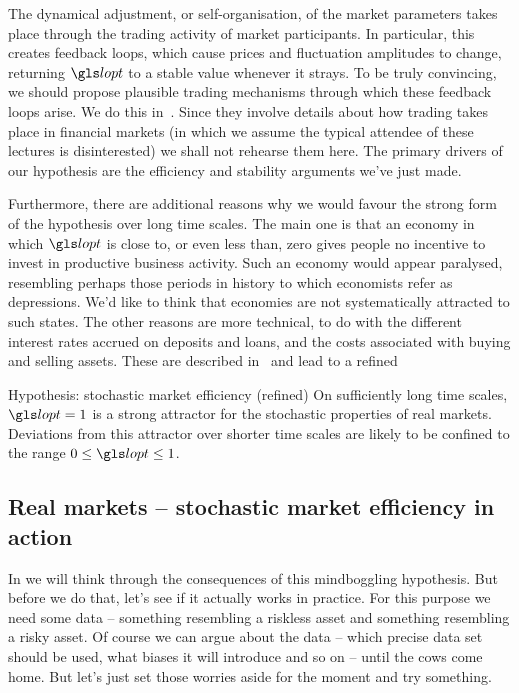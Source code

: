 The dynamical adjustment, or self-organisation, of the market parameters takes place through the trading activity of market participants. In particular, this creates feedback loops, which cause prices and fluctuation amplitudes to change, returning $\lopt$ to a stable value whenever it strays. To be truly convincing, we should propose plausible trading mechanisms through which these feedback loops arise. We do this in~\cite{PetersAdamou2013}. Since they involve details about how trading takes place in financial markets (in which we assume the typical attendee of these lectures is disinterested) we shall not rehearse them here. The primary drivers of our hypothesis are the efficiency and stability arguments we've just made.

Furthermore, there are additional reasons why we would favour the strong form of the hypothesis over long time scales. The main one is that an economy in which $\lopt$ is close to, or even less than, zero gives people no incentive to invest in productive business activity. Such an economy would appear paralysed, resembling perhaps those periods in history to which economists refer as depressions. We'd like to think that economies are not systematically attracted to such states. The other reasons are more technical, to do with the different interest rates accrued on deposits and loans, and the costs associated with buying and selling assets. These are described in~\cite{PetersAdamou2013} and lead to a refined
\begin{keypts}{Hypothesis: stochastic market efficiency (refined)}
On sufficiently long time scales, $\lopt=1$ is a strong attractor for the stochastic properties of real markets. Deviations from this attractor over shorter time scales are likely to be confined to the range $0\leq\lopt\leq1$.
\end{keypts}

\subsection{Real markets -- stochastic market efficiency in action}
In  we will think through the consequences of this mindboggling hypothesis. But before we do that, let's see if it actually works in practice. For this purpose we need some data -- something resembling a riskless asset and something resembling a risky asset. Of course we can argue about the data -- which precise data set should be used, what biases it will introduce and so on -- until the cows come home. But let's just set those worries aside for the moment and try something.

